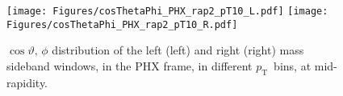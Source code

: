 \documentclass[12pt]{article}
\newcommand{\pt}{$p_{\mathrm{T}}$}
\begin{document}
\begin{figure}[htbp]
\centering
\texttt{[image: Figures/cosThetaPhi\_PHX\_rap2\_pT10\_L.pdf]}
\texttt{[image: Figures/cosThetaPhi\_PHX\_rap2\_pT10\_R.pdf]}
\caption{$\cos\vartheta,\,\phi$ distribution of the left (left) and
  right (right) mass sideband windows, in the PHX frame, in different
  \pt\ bins, at mid-rapidity.} 
\end{figure}
\clearpage
\end{document}
